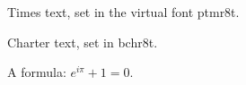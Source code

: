 \documentclass{article}
\begin{document}
Times text, set in the virtual font ptmr8t.

{\selectfont Charter text, set in bchr8t.}

A formula: $e^{i\pi} + 1 = 0$.
\end{document}
